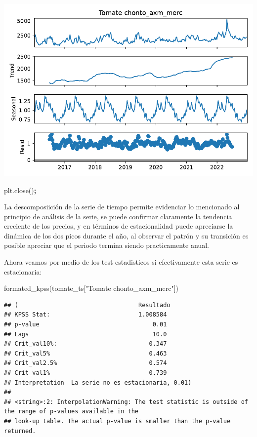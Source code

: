 \documentclass[
]{book}
\newenvironment{Shaded}{\begin{snugshade}}{\end{snugshade}}
\newcommand{\NormalTok}[1]{#1}
\newcommand{\OperatorTok}[1]{\textcolor[rgb]{0.81,0.36,0.00}{\textbf{#1}}}
\newcommand{\StringTok}[1]{\textcolor[rgb]{0.31,0.60,0.02}{#1}}
\begin{document}
\includegraphics{bookdown-demo_files/figure-latex/unnamed-chunk-78-49.pdf}

\begin{Shaded}
\begin{Highlighting}[]
\NormalTok{plt.close()}\OperatorTok{;}
\end{Highlighting}
\end{Shaded}

La descomposiición de la serie de tiempo permite evidenciar lo mencionado al principio de análisis de la serie, se puede confirmar claramente la tendencia creciente de los precios, y en términos de estacionalidad puede apreciarse la dinámica de los dos picos durante el año, al observar el patrón y su transición es posible apreciar que el periodo termina siendo practicamente anual.

Ahora veamos por medio de los test estadisticos si efectivamente esta serie es estacionaria:

\begin{Shaded}
\begin{Highlighting}[]

\NormalTok{formated\_kpss(tomate\_ts[}\StringTok{"Tomate chonto\_axm\_merc"}\NormalTok{])}
\end{Highlighting}
\end{Shaded}

\begin{verbatim}
## (                                  Resultado
## KPSS Stat:                         1.008584
## p-value                                0.01
## Lags                                   10.0
## Crit_val10%:                          0.347
## Crit_val5%                            0.463
## Crit_val2.5%                          0.574
## Crit_val1%                            0.739
## Interpretation  La serie no es estacionaria, 0.01)
## 
## <string>:2: InterpolationWarning: The test statistic is outside of the range of p-values available in the
## look-up table. The actual p-value is smaller than the p-value returned.
\end{verbatim}
\end{document}
